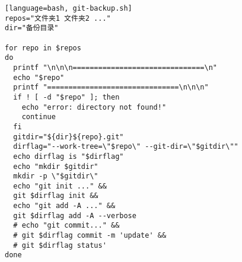 
\begin{issues}
\issueDraft
\end{issues}



\begin{lstlisting}[language=bash, git-backup.sh]
repos="文件夹1 文件夹2 ..."
dir="备份目录"

for repo in $repos
do
  printf "\n\n\n===============================\n"
  echo "$repo"
  printf "===============================\n\n\n"
  if ! [ -d "$repo" ]; then
    echo "error: directory not found!"
    continue
  fi
  gitdir="${dir}${repo}.git"
  dirflag="--work-tree=\"$repo\" --git-dir=\"$gitdir\""
  echo dirflag is "$dirflag"
  echo "mkdir $gitdir"
  mkdir -p \"$gitdir\"
  echo "git init ..." &&
  git $dirflag init &&
  echo "git add -A ..." &&
  git $dirflag add -A --verbose
  # echo "git commit..." &&
  # git $dirflag commit -m 'update' &&
  # git $dirflag status'
done
\end{lstlisting}

